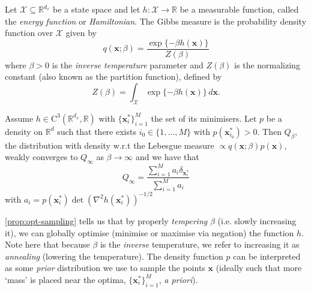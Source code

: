 \begin{definition}
    Let $\mathcal{X} \subseteq \mathbb{R}^{d_x}$ be a state space and let
    $h: \mathcal{X} \rightarrow \mathbb{R}$ be a measurable function, called the
    \emph{energy function} or \emph{Hamiltonian}. The Gibbs measure is the probability density
    function over $\mathcal{X}$ given by
    \begin{equation}
        q(\mathbf{x}; \beta) = \frac{\exp\{-\beta h(\mathbf{x})\}}{Z(\beta)} \label{eq:gibbs-measure}
    \end{equation}
    where $\beta > 0$ is the \emph{inverse temperature} parameter and $Z(\beta)$ is the normalizing
    constant (also known as the partition function), defined by
    \begin{equation*}
        Z(\beta) = \int_{\mathcal{X}} \exp\{-\beta h(\mathbf{x})\} \, d\mathbf{x}.
    \end{equation*}
\end{definition}

\begin{proposition} \label{prop:opt-sampling}
    Assume $h \in \mathrm{C}^3(\mathbb{R}^{d_x}, \mathbb{R})$ with $\{\mathbf{x}_i^*\}_{i=1}^M$ the
    set of its minimisers. Let $p$ be a density on $\mathbb{R}^d$ such that there exists
    $i_0 \in \{1, \dots, M\}$ with $p(\mathbf{x}_{i_0}^*) > 0$. Then $Q_\beta$, the distribution
    with density w.r.t the Lebesgue measure $\propto q(\mathbf{x}; \beta)p(\mathbf{x})$, weakly
    converges to $Q_{\infty}$ as $\beta \rightarrow \infty$ and we have that
    \begin{equation}
        Q_\infty = \frac{\sum_{i=1}^{M}a_i\delta_{\mathbf{x}_i^*}}{\sum_{i=1}^{M}a_i} \label{eq:opt-target-inf}
    \end{equation}
    with $a_i = p(\mathbf{x}_i^*)\det(\nabla^2h(\mathbf{x}_i^*))^{-1/2}$
\end{proposition}

\begin{remark}[Annealing]
    \autoref{prop:opt-sampling} tells us that by properly \emph{tempering}
    $\beta$ (i.e. slowly increasing it), we can globally optimise (minimise or maximise via
    negation) the function $h$. Note here that because $\beta$ is the \emph{inverse} temperature,
    we refer to increasing it as \emph{annealing} (lowering the temperature). The density function
    $p$ can be interpreted as some \emph{prior} distribution we use to sample the points $\mathbf{x}$
    (ideally such that more `mass' is placed near the optima, $\{\mathbf{x}_i^*\}_{i=1}^M$,
    \emph{a priori}).
\end{remark}

